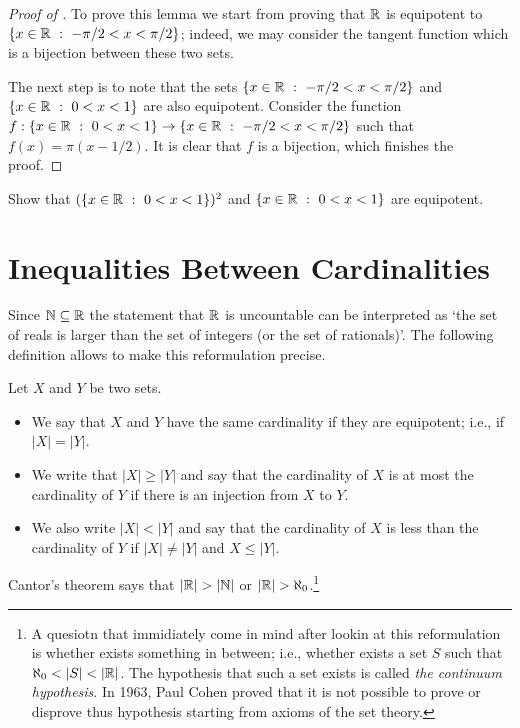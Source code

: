 \begin{proof}[Proof of ]
  To prove this lemma we start from proving that ${\mathbb{R}}$ is equipotent to 
  $\set[-\pi / 2 < x < \pi / 2]{x \in \R}$; indeed, we may consider the tangent
  function which is a bijection between these two sets.

  The next step is to note that the sets $\set[-\pi / 2 < x < \pi / 2]{x \in \R}$ and 
  $\set[0 < x < 1]{x \in \R}$ are also equipotent. Consider the function 
  $f : \set[0 < x < 1]{x \in \R} \to \set[-\pi / 2 < x < \pi / 2]{x \in \R}$
  such that $f(x) = \pi (x - 1 / 2)$. It is clear that $f$ is a bijection, which
  finishes the proof.
\end{proof}

\begin{exercise}
  Show that $(\set[0 < x < 1]{x \in \R})^2$ and $\set[0 < x < 1]{x \in \R}$ are equipotent.
\end{exercise}

\section{Inequalities Between Cardinalities}
Since ${\mathbb{N}} \subseteq {\mathbb{R}}$ the statement that ${\mathbb{R}}$ is uncountable can be
interpreted as `the set of reals is larger than the set of integers (or the set
of rationals)'. The following definition allows to make this reformulation
precise.
\begin{definition}
  Let $X$ and $Y$ be two sets. 
  \begin{itemize}
    \item We say that $X$ and $Y$ have the same cardinality if they are
      equipotent; i.e., if $|X| = |Y|$.
    \item We write that $|X| \ge |Y|$ and say that the cardinality of $X$ is at
      most the cardinality of $Y$ if there is an injection from $X$ to $Y$.
    \item We also write $|X| < |Y|$ and say that the cardinality of $X$ is less
      than the cardinality of $Y$ if $|X| \neq |Y|$ and $X \le |Y|$.
  \end{itemize}
\end{definition}
Cantor's theorem says that $|{\mathbb{R}}| > |{\mathbb{N}}|$ or $|{\mathbb{R}}| > \aleph_0$.\footnote{%
  A quesiotn that immidiately come in mind after lookin at this reformulation is
  whether exists something in between; i.e., whether exists a set $S$ such that
  $\aleph_0 < |S| < |{\mathbb{R}}|$. The hypothesis that such a set exists is called
  \emph{the continuum hypothesis}. In 1963, Paul Cohen proved that it is not
  possible to prove or disprove thus hypothesis starting from axioms of the set
  theory.
}

